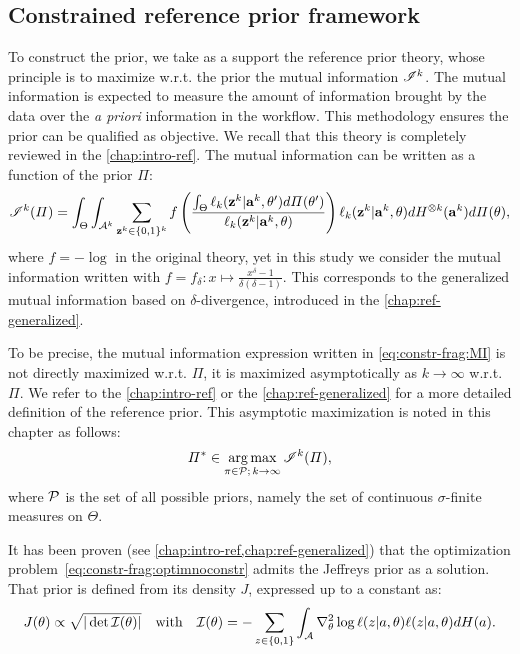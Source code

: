 \subsection{Constrained reference prior framework}



To construct the prior, we take as a support the reference prior theory, whose principle is to maximize w.r.t. the prior the mutual information $\mathscr{I}^k$. The mutual information is expected to measure the amount of information brought by the data over the \emph{a priori} information in the workflow. This methodology ensures the prior can be qualified as objective. We recall that this theory is completely reviewed in the \cref{chap:intro-ref}.
The mutual information can be written as a function of the prior $\varPi$:
\begin{equation}\label{eq:constr-frag:MI}
    \mathscr{I}^k(\varPi) = \int_{\Theta}\int_{\mathcal{A}^k}\sum_{\mathbf{z}^k\in\{0,1\}^k}f\left(\frac{\int_\Theta\ell_k(\mathbf{z}^k|\mathbf{a}^k,\theta')d\varPi(\theta')  }{\ell_k(\mathbf{z}^k|\mathbf{a}^k,\theta)}\right)\ell_k(\mathbf{z}^k|\mathbf{a}^k,\theta)dH^{\otimes k}(\mathbf{a}^k)d\varPi(\theta)  ,    
\end{equation}
where $f=-\log$ in the original theory, yet in this study we consider the mutual information written with $f=f_\delta:x\mapsto\frac{x^\delta-1}{\delta(\delta-1)}$.
This corresponds to the generalized mutual information 
based on $\delta$-divergence, introduced in the \cref{chap:ref-generalized}. 

To be precise, the mutual information expression written in \cref{eq:constr-frag:MI} is not directly maximized w.r.t. $\varPi$, it is maximized asymptotically as $k\rightarrow\infty$ w.r.t. $\varPi$. We refer to the \cref{chap:intro-ref} or the \cref{chap:ref-generalized} for a more detailed definition of the reference prior. This asymptotic maximization is noted in this chapter as follows:
\begin{equation}\label{eq:constr-frag:optimnoconstr}
    \varPi^\ast\in\operatorname*{arg\,max}_{\pi\in\mathcal{P};\,k\rightarrow\infty}\mathscr{I}^k(\varPi),
\end{equation}
where $\mathcal{P}$ is the set of all possible priors, namely the set of continuous $\sigma$-finite measures on $\Theta$.

It has been proven (see \cref{chap:intro-ref,chap:ref-generalized}) that the optimization problem~\eqref{eq:constr-frag:optimnoconstr} admits the Jeffreys prior as a solution. That prior is defined from its density $J$, expressed up to a constant as:
    \begin{equation}
        J(\theta)\propto\sqrt{|\det\mathcal{I}(\theta)|}\quad\text{with}\quad \mathcal{I}(\theta) = -\sum_{z\in\{0,1\}}\int_{\mathcal{A}}\nabla_\theta^2\log\ell(z|a,\theta) \ell(z|a,\theta)dH(a).
    \end{equation}

